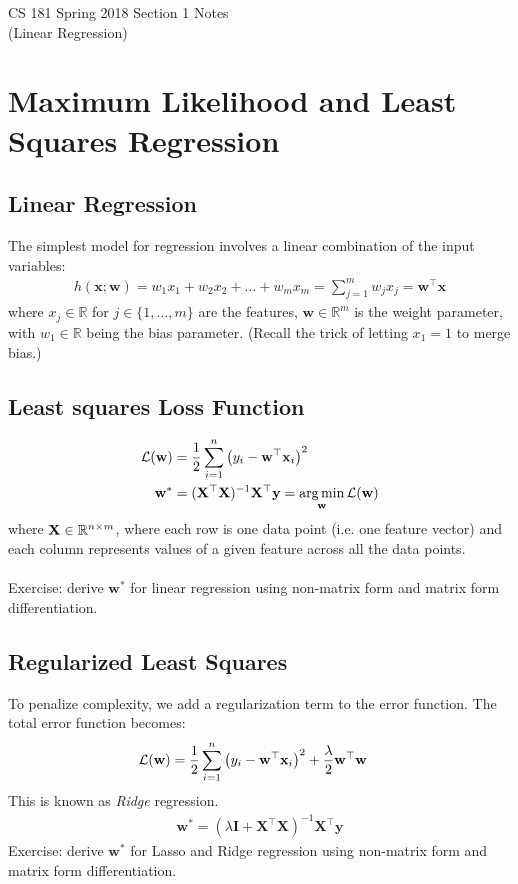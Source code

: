 \documentclass[11pt,letterpaper]{article}
\begin{document}
\begin{center}
\LARGE{CS 181 Spring 2018 Section 1 Notes}\\
(Linear Regression)
\end{center}

\section{Maximum Likelihood and Least Squares Regression}
\subsection{Linear Regression}
The simplest model for regression involves a linear combination of the input variables:
\begin{align}
    h(\mathbf{x};\mathbf{w})= w_1x_1+w_2x_2+\ldots+w_mx_m = \sum_{j=1}^m w_jx_j = \mathbf{w}^\top\mathbf{x}
\end{align}
where $x_j \in \mathbb{R}$ for $j \in \{1,\hdots,m\}$ are the features, $\mathbf{w} \in \mathbb{R}^m$ is the weight parameter, with $w_1 \in \mathbb{R}$ being the bias parameter.
(Recall the trick of letting $x_1 = 1$ to merge bias.)

\subsection{Least squares Loss Function}
\begin{align}
    \mcL(\mathbf{w}) &=\dfrac{1}{2}\sum_{i=1}^n\left(y_i-\mathbf{w}^\top\mathbf{x}_i\right)^2\\
    \mathbf{w}^* &= (\mathbf{X}^\top\mathbf{X})^{-1}\mathbf{X}^\top\mathbf{y} = \argmin_{\mathbf{w}} \mcL(\mathbf{w})
\end{align}
where $\mathbf{X} \in \mathbb{R}^{n \times m}$, where each row is one data point (i.e. one feature vector) and each column represents values of a given feature across all the data points.\\
\\
Exercise: derive $\mathbf{w}^*$ for linear regression using non-matrix form and matrix form differentiation.
\vspace{8cm}

\subsection{Regularized Least Squares}
To penalize complexity, we add a regularization term to the error function. The total error function becomes:
\begin{align}
    \mathcal{L}(\mathbf{w})&= \dfrac{1}{2}\sum_{i=1}^n\left(y_i-\mathbf{w}^\top\mathbf{x}_i\right)^2 + \dfrac{\lambda}{2}\mathbf{w}^\top\mathbf{w}
\end{align}
This is known as \textit{Ridge} regression.
\begin{align}
    \mathbf{w}^* = (\lambda\mathbf{I}+\mathbf{X}^\top\mathbf{X})^{-1}\mathbf{X}^\top\mathbf{y}
\end{align}
Exercise: derive $\mathbf{w}^*$ for Lasso and Ridge regression using non-matrix form and matrix form differentiation.
\vspace{8cm}
\end{document}
